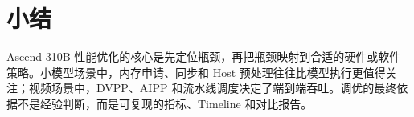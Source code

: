 \section{小结}\label{src-book-chapter8-h18}

Ascend 310B
性能优化的核心是先定位瓶颈，再把瓶颈映射到合适的硬件或软件策略。小模型场景中，内存申请、同步和
Host 预处理往往比模型执行更值得关注；视频场景中，DVPP、AIPP
和流水线调度决定了端到端吞吐。调优的最终依据不是经验判断，而是可复现的指标、Timeline
和对比报告。
